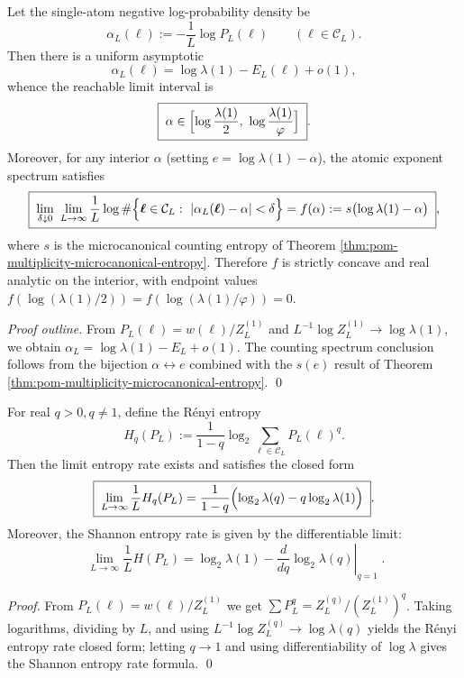 \begin{proposition}\label{prop:pom-multiplicity-atom-multifractal}
Let the single-atom negative log-probability density be
\[
\alpha_L(\boldsymbol{\ell}):=-\frac{1}{L}\log P_L(\boldsymbol{\ell})\qquad(\boldsymbol{\ell}\in\mathcal{C}_L).
\]
Then there is a uniform asymptotic
\[
\alpha_L(\boldsymbol{\ell})=\log\lambda(1)-E_L(\boldsymbol{\ell})+o(1),
\]
whence the reachable limit interval is
\[
\boxed{\;
\alpha\in\Bigl[\log\frac{\lambda(1)}{2},\ \log\frac{\lambda(1)}{\varphi}\Bigr]\; } .
\]
Moreover, for any interior \(\alpha\) (setting \(e=\log\lambda(1)-\alpha\)), the atomic exponent spectrum satisfies
\[
\boxed{\;
\lim_{\delta\downarrow 0}\ \lim_{L\to\infty}\frac{1}{L}\log
\#\Bigl\{\boldsymbol{\ell}\in\mathcal{C}_L:\ |\alpha_L(\boldsymbol{\ell})-\alpha|<\delta\Bigr\}
=f(\alpha):=s\bigl(\log\lambda(1)-\alpha\bigr)\; } ,
\]
where \(s\) is the microcanonical counting entropy of Theorem \ref{thm:pom-multiplicity-microcanonical-entropy}.
Therefore \(f\) is strictly concave and real analytic on the interior, with endpoint values \(f(\log(\lambda(1)/2))=f(\log(\lambda(1)/\varphi))=0\).
\end{proposition}
\begin{proof}[Proof outline]
From \(P_L(\boldsymbol{\ell})=w(\boldsymbol{\ell})/Z_L^{(1)}\) and \(L^{-1}\log Z_L^{(1)}\to\log\lambda(1)\), we obtain \(\alpha_L=\log\lambda(1)-E_L+o(1)\).
The counting spectrum conclusion follows from the bijection \(\alpha\leftrightarrow e\) combined with the \(s(e)\) result of Theorem \ref{thm:pom-multiplicity-microcanonical-entropy}. \qed
\end{proof}

\begin{proposition}\label{prop:pom-multiplicity-renyi-continuous}
For real \(q>0,q\ne 1\), define the R\'enyi entropy
\[
H_q(P_L):=\frac{1}{1-q}\log_2\sum_{\boldsymbol{\ell}\in\mathcal{C}_L}P_L(\boldsymbol{\ell})^{q}.
\]
Then the limit entropy rate exists and satisfies the closed form
\[
\boxed{\;
\lim_{L\to\infty}\frac{1}{L}H_q(P_L)
=\frac{1}{1-q}\Bigl(\log_2\lambda(q)-q\log_2\lambda(1)\Bigr)\; } .
\]
Moreover, the Shannon entropy rate is given by the differentiable limit:
\[
\boxed{\;
\lim_{L\to\infty}\frac{1}{L}H(P_L)
=\log_2\lambda(1)-\left.\frac{d}{dq}\log_2\lambda(q)\right|_{q=1}\; } .
\]
\end{proposition}
\begin{proof}
From \(P_L(\boldsymbol{\ell})=w(\boldsymbol{\ell})/Z_L^{(1)}\) we get
\(
\sum P_L^q=Z_L^{(q)}/(Z_L^{(1)})^q
\).
Taking logarithms, dividing by \(L\), and using \(L^{-1}\log Z_L^{(q)}\to\log\lambda(q)\) yields the R\'enyi entropy rate closed form; letting \(q\to 1\) and using differentiability of \(\log\lambda\) gives the Shannon entropy rate formula. \qed
\end{proof}

